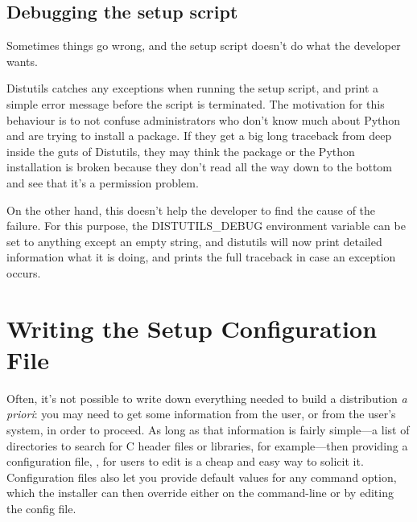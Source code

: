 \documentclass{manual}
\begin{document}
\section{Debugging the setup script}

Sometimes things go wrong, and the setup script doesn't do what the
developer wants.

Distutils catches any exceptions when running the setup script, and
print a simple error message before the script is terminated.  The
motivation for this behaviour is to not confuse administrators who
don't know much about Python and are trying to install a package.  If
they get a big long traceback from deep inside the guts of Distutils,
they may think the package or the Python installation is broken
because they don't read all the way down to the bottom and see that
it's a permission problem.

On the other hand, this doesn't help the developer to find the cause
of the failure. For this purpose, the DISTUTILS_DEBUG environment
variable can be set to anything except an empty string, and distutils
will now print detailed information what it is doing, and prints the
full traceback in case an exception occurs.

\chapter{Writing the Setup Configuration File}
\label{setup-config}

Often, it's not possible to write down everything needed to build a
distribution \emph{a priori}: you may need to get some information from
the user, or from the user's system, in order to proceed.  As long as
that information is fairly simple---a list of directories to search for
C header files or libraries, for example---then providing a
configuration file, , for users to edit is a cheap and
easy way to solicit it.  Configuration files also let you provide
default values for any command option, which the installer can then
override either on the command-line or by editing the config file.

\end{document}
